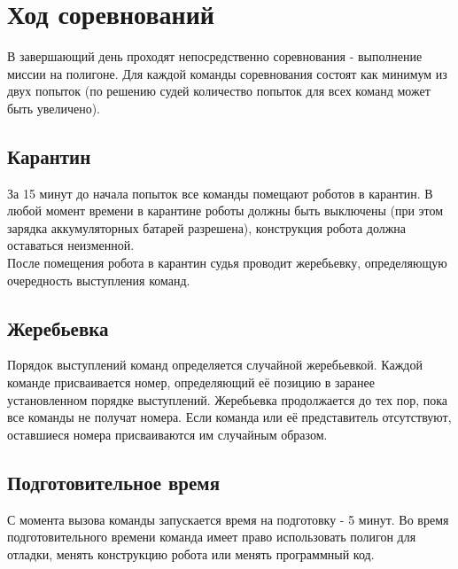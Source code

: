 \documentclass[12pt]{article}
\begin{document}
\section{Ход соревнований} \hspace*{1cm}
В завершающий день проходят непосредственно соревнования -  выполнение миссии на полигоне. Для каждой команды соревнования состоят как минимум из двух попыток (по решению судей количество попыток для всех команд может быть увеличено).

\subsection{Карантин} \hspace*{1cm}
За 15 минут до начала попыток все команды помещают роботов в карантин. В любой момент времени в карантине роботы должны быть выключены (при этом зарядка аккумуляторных батарей разрешена), конструкция робота должна оставаться неизменной. 
\\\hspace*{1cm}После помещения робота в карантин судья проводит жеребьевку, определяющую очередность выступления команд.

\subsection{Жеребьевка} \hspace*{1cm}
Порядок выступлений команд определяется случайной жеребьевкой. Каждой команде присваивается номер, определяющий её позицию в заранее установленном порядке выступлений. Жеребьевка продолжается до тех пор, пока все команды не получат номера. Если команда или её представитель отсутствуют, оставшиеся номера присваиваются им случайным образом.

\subsection{Подготовительное время} \hspace*{1cm}
С момента вызова команды запускается время на подготовку - 5 минут. Во время подготовительного времени команда имеет право использовать полигон для отладки, менять конструкцию робота или менять программный код.

\end{document}
